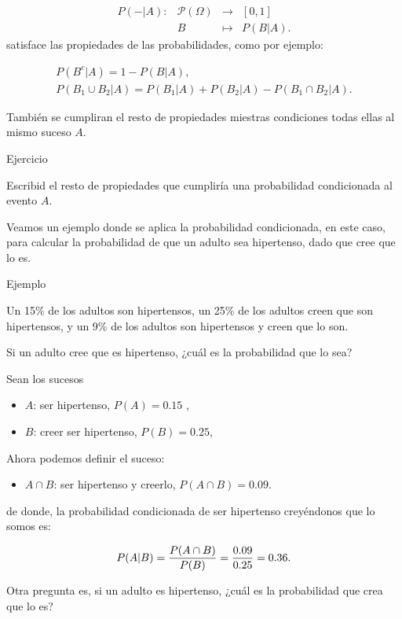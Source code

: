 \documentclass[
  letterpaper,
  DIV=11,
  numbers=noendperiod]{scrreprt}
\providecommand{\tightlist}{%
  \setlength{\itemsep}{0pt}\setlength{\parskip}{0pt}}\usepackage{longtable,booktabs,array}
\begin{document}
\[
\begin{array}{rccl}
P(-|A):& \mathcal{P}(\Omega) & \to & [0,1]\\
&B & \mapsto & P(B|A).
\end{array}
\] satisface las propiedades de las probabilidades, como por ejemplo:

\[
\begin{array}{l}
P(B^c|A)=1-P(B|A),\\
P(B_1\cup B_2|A)=P(B_1|A)+P(B_2|A)-P(B_1\cap B_2|A).
\end{array}
\]

También se cumpliran el resto de propiedades miestras condiciones todas
ellas al mismo suceso \(A\).

Ejercicio

Escribid el resto de propiedades que cumpliría una probabilidad
condicionada al evento \(A\).

Veamos un ejemplo donde se aplica la probabilidad condicionada, en este
caso, para calcular la probabilidad de que un adulto sea hipertenso,
dado que cree que lo es.

Ejemplo

Un 15\% de los adultos son hipertensos, un 25\% de los adultos creen que
son hipertensos, y un 9\% de los adultos son hipertensos y creen que lo
son.

Si un adulto cree que es hipertenso, ¿cuál es la probabilidad que lo
sea?

Sean los sucesos

\begin{itemize}
\tightlist
\item
  \(A\): ser hipertenso, \(P(A)=0.15\) ,
\item
  \(B\): creer ser hipertenso, \(P(B)=0.25\),
\end{itemize}

Ahora podemos definir el suceso:

\begin{itemize}
\tightlist
\item
  \(A\cap B\): ser hipertenso y creerlo, \(P(A\cap B)=0.09\).
\end{itemize}

de donde, la probabilidad condicionada de ser hipertenso creyéndonos que
lo somos es:

\[\scriptsize P(A|B)=\dfrac{P(A\cap B)}{P(B)}=\dfrac{0.09}{0.25}=0.36.\]

Otra pregunta es, si un adulto es hipertenso, ¿cuál es la probabilidad
que crea que lo es?
\end{document}
